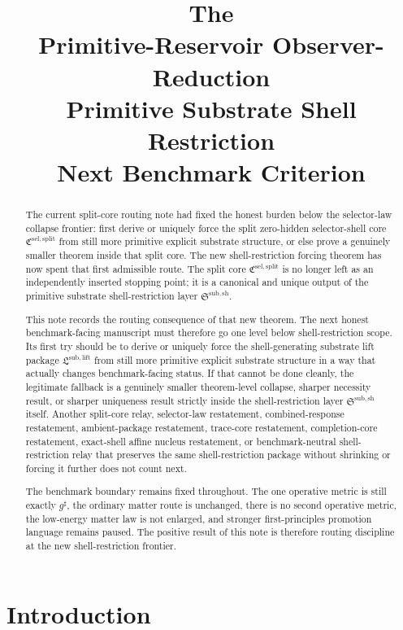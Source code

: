\documentclass[11pt]{article}
\title{\textbf{The \TheoryName{}}\\[0.4em]
\large Primitive-Reservoir Observer-Reduction\\
\large Primitive Substrate Shell Restriction\\
\large Next Benchmark Criterion}
\author{}
\date{}
\newcommand{\CompletedMetric}{g^{\sharp}}
\newcommand{\SelectorCore}{\mathfrak C^{\mathrm{sel,split}}}
\newcommand{\ShellRestriction}{\mathfrak S^{\mathrm{sub,sh}}}
\newcommand{\LiftPackage}{\mathfrak L^{\mathrm{sub,lift}}}
\begin{document}
\maketitle

\begin{abstract}
The current split-core routing note had fixed the honest burden below the selector-law collapse frontier: first derive or uniquely force the split zero-hidden selector-shell core \(\SelectorCore\) from still more primitive explicit substrate structure, or else prove a genuinely smaller theorem inside that split core. The new shell-restriction forcing theorem has now spent that first admissible route. The split core \(\SelectorCore\) is no longer left as an independently inserted stopping point; it is a canonical and unique output of the primitive substrate shell-restriction layer \(\ShellRestriction\).

This note records the routing consequence of that new theorem. The next honest benchmark-facing manuscript must therefore go one level below shell-restriction scope. Its first try should be to derive or uniquely force the shell-generating substrate lift package \(\LiftPackage\) from still more primitive explicit substrate structure in a way that actually changes benchmark-facing status. If that cannot be done cleanly, the legitimate fallback is a genuinely smaller theorem-level collapse, sharper necessity result, or sharper uniqueness result strictly inside the shell-restriction layer \(\ShellRestriction\) itself. Another split-core relay, selector-law restatement, combined-response restatement, ambient-package restatement, trace-core restatement, completion-core restatement, exact-shell affine nucleus restatement, or benchmark-neutral shell-restriction relay that preserves the same shell-restriction package without shrinking or forcing it further does not count next.

The benchmark boundary remains fixed throughout. The one operative metric is still exactly \(\CompletedMetric\), the ordinary matter route is unchanged, there is no second operative metric, the low-energy matter law is not enlarged, and stronger first-principles promotion language remains paused. The positive result of this note is therefore routing discipline at the new shell-restriction frontier.
\end{abstract}

\section{Introduction}
\end{document}
